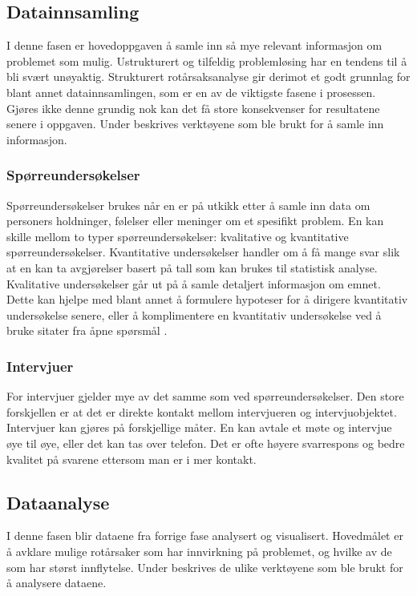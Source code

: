 \subsection{Datainnsamling}
I denne fasen er hovedoppgaven å samle inn så mye relevant informasjon om problemet som mulig. Ustrukturert og tilfeldig problemløsing har en tendens til å bli svært unøyaktig. Strukturert rotårsaksanalyse gir derimot et godt grunnlag for blant annet datainnsamlingen, som er en av de viktigste fasene i prosessen. Gjøres ikke denne grundig nok kan det få store konsekvenser for resultatene senere i oppgaven. Under beskrives verktøyene som ble brukt for å samle inn informasjon. 

\subsubsection{Spørreundersøkelser}
Spørreundersøkelser brukes når en er på utkikk etter å samle inn data om personers holdninger, følelser eller meninger om et spesifikt problem. En kan skille mellom to typer spørreundersøkelser: kvalitative og kvantitative spørreundersøkelser. Kvantitative undersøkelser handler om å få mange svar slik at en kan ta avgjørelser basert på tall som kan brukes til statistisk analyse. Kvalitative undersøkelser går ut på å samle detaljert informasjon om emnet. Dette kan hjelpe med blant annet å formulere hypoteser for å dirigere kvantitativ undersøkelse senere, eller å komplimentere en kvantitativ undersøkelse ved å bruke sitater fra åpne spørsmål \cite{KvalKvant}. 

\subsubsection{Intervjuer}
For intervjuer gjelder mye av det samme som ved spørreundersøkelser. Den store forskjellen er at det er direkte kontakt mellom intervjueren og intervjuobjektet. Intervjuer kan gjøres på forskjellige måter. En kan avtale et møte og intervjue øye til øye, eller det kan tas over telefon. Det er ofte høyere svarrespons og bedre kvalitet på svarene ettersom man er i mer kontakt. 

\subsection{Dataanalyse}
I denne fasen blir dataene fra forrige fase analysert og visualisert. Hovedmålet er å avklare mulige rotårsaker som har innvirkning på problemet, og hvilke av de som har størst innflytelse. Under beskrives de ulike verktøyene som ble brukt for å analysere dataene.

